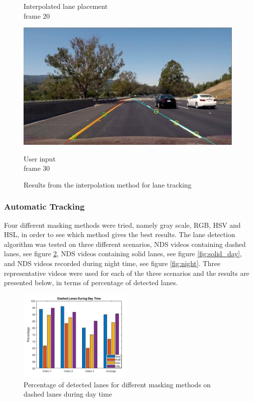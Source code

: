 \begin{figure}[H]
\begin{minipage}[b]{0.45\linewidth}
    \caption*{Interpolated lane placement\\ frame 20}
\end{minipage}
\begin{minipage}[b]{0.45\linewidth}
    \includegraphics[width=\linewidth]{Figures/interpolation_lane_frame_30.jpg}
    \caption*{User input\\ frame 30}
\end{minipage}
\caption{Results from the interpolation method for lane tracking}
\label{fig:lane_tracking_interpolation}
\end{figure}


\subsubsection{Automatic Tracking}

Four different masking methods were tried, namely gray scale, RGB, HSV and HSL, in order to see which method gives the best results. The lane detection algorithm was tested on three different scenarios, NDS videos containing dashed lanes, see figure \ref{fig:dash_day}, NDS videos containing solid lanes, see figure \ref{fig:solid_day}, and NDS videos recorded during night time, see figure \ref{fig:night}. Three representative videos were used for each of the three scenarios and the results are presented below, in terms of percentage of detected lanes.

\begin{figure}[H]
    \centering    \includegraphics[width = 0.5\textwidth]{Figures/Result_01.pdf}
    \caption{Percentage of detected lanes for different masking methods on dashed lanes during day time}
    \label{fig:dash_day}
\end{figure}

